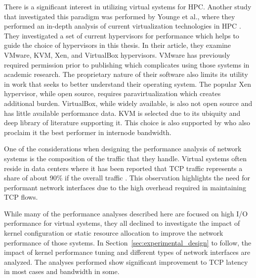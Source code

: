 There is a significant interest in utilizing virtual systems for HPC.  Another study that investigated this paradigm was performed by Younge et al., where they performed an in-depth analysis of current virtualization technologies in HPC \autocite{_younge_1}.
They investigated a set of current hypervisors for performance which helps to guide the choice of hypervisors in this thesis. 
In their article, they examine VMware, KVM, Xen, and VirtualBox hypervisors. 
VMware has previously required permission prior to publishing which complicates using those systems in academic research.  
The proprietary nature of their software also limits its utility in work that seeks to better understand their operating system.  
The popular Xen hypervisor, while open source, requires paravirtualization which creates additional burden.
VirtualBox, while widely available, is also not open source and has little available performance data.  
KVM is selected due to its ubiquity and deep library of literature supporting it.
This choice is also supported by \autocite{_younge_1} who also proclaim it the best performer in internode bandwidth.  

One of the considerations when designing the performance analysis of network systems is the composition of the traffic that they handle.  
Virtual systems often reside in data centers where it has been reported that TCP traffic represents a share of about 90\% if the overall traffic \autocite{haTCPCloud2013}.
This observation highlights the need for performant network interfaces due to the high overhead required in maintaining TCP flows.

While many of the performance analyses described here are focused on high I/O performance for virtual systems, they all declined to investigate the impact of kernel configuration or static resource allocation to improve the network performance of those systems.  
In Section~\ref{sec:experimental_design} to follow, the impact of kernel performance tuning and different types of network interfaces are analyzed.  
The analyses performed show significant improvement to TCP latency in most cases and bandwidth in some.


\nocite{_dpdk_1, _adams_1, _chowdhury_1, seo2014performance, gomes2014performance, kivity2014osv, wang2011understanding}


